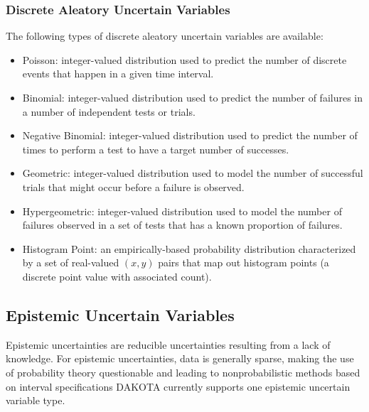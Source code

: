 \subsubsection{Discrete Aleatory Uncertain Variables}\label{variables:uncertain:dauv}

The following types of discrete aleatory uncertain variables are available:

\begin{itemize}

\item Poisson: integer-valued distribution used to predict the number of 
  discrete events that happen in a given time interval.

\item Binomial: integer-valued distribution used to predict 
  the number of failures in a number of independent tests or trials.

\item Negative Binomial: integer-valued distribution used to predict the
  number of times to perform a test to have a target number of successes.

\item Geometric: integer-valued distribution used to model the number of 
  successful trials that might occur before a failure is observed.

\item Hypergeometric: integer-valued distribution used to model the number 
  of failures observed in a set of tests that has a known proportion of 
  failures.

\item Histogram Point: an empirically-based probability distribution 
  characterized by a set of real-valued $(x,y)$ pairs that map out
  histogram points (a discrete point value with associated count).

\end{itemize}


\subsection{Epistemic Uncertain Variables}\label{variables:uncertain:euv}

Epistemic uncertainties are reducible uncertainties resulting from a
lack of knowledge.  For epistemic uncertainties, data is generally
sparse, making the use of probability theory questionable and leading
to nonprobabilistic methods based on interval specifications  DAKOTA
currently supports one epistemic uncertain variable type.


